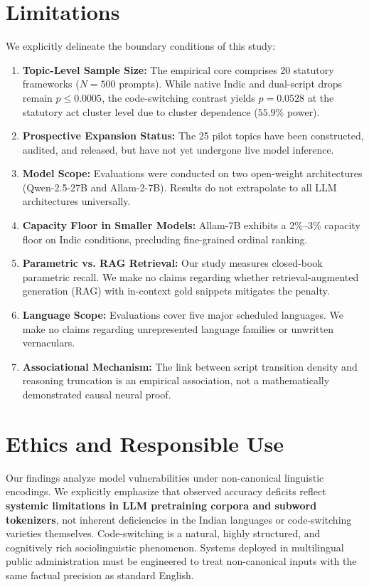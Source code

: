 \documentclass[11pt]{article}
\begin{document}
\section{Limitations}
\label{sec:limitations}

We explicitly delineate the boundary conditions of this study:
\begin{enumerate}
    \item \textbf{Topic-Level Sample Size:} The empirical core comprises 20 statutory frameworks ($N=500$ prompts). While native Indic and dual-script drops remain $p \le 0.0005$, the code-switching contrast yields $p = 0.0528$ at the statutory act cluster level due to cluster dependence ($55.9\%$ power).
    \item \textbf{Prospective Expansion Status:} The 25 pilot topics have been constructed, audited, and released, but have not yet undergone live model inference.
    \item \textbf{Model Scope:} Evaluations were conducted on two open-weight architectures (Qwen-2.5-27B and Allam-2-7B). Results do not extrapolate to all LLM architectures universally.
    \item \textbf{Capacity Floor in Smaller Models:} Allam-7B exhibits a 2\%--3\% capacity floor on Indic conditions, precluding fine-grained ordinal ranking.
    \item \textbf{Parametric vs. RAG Retrieval:} Our study measures closed-book parametric recall. We make no claims regarding whether retrieval-augmented generation (RAG) with in-context gold snippets mitigates the penalty.
    \item \textbf{Language Scope:} Evaluations cover five major scheduled languages. We make no claims regarding unrepresented language families or unwritten vernaculars.
    \item \textbf{Associational Mechanism:} The link between script transition density and reasoning truncation is an empirical association, not a mathematically demonstrated causal neural proof.
\end{enumerate}

\section{Ethics and Responsible Use}
\label{sec:ethics}

Our findings analyze model vulnerabilities under non-canonical linguistic encodings. We explicitly emphasize that observed accuracy deficits reflect \textbf{systemic limitations in LLM pretraining corpora and subword tokenizers}, not inherent deficiencies in the Indian languages or code-switching varieties themselves. Code-switching is a natural, highly structured, and cognitively rich sociolinguistic phenomenon. Systems deployed in multilingual public administration must be engineered to treat non-canonical inputs with the same factual precision as standard English.
\end{document}
